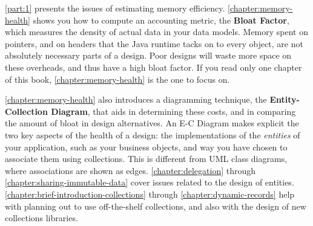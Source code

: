 

\autoref{part:1} presents the issues of estimating memory efficiency.
\autoref{chapter:memory-health} shows you how to compute an accounting metric,
the \textbf{Bloat Factor}, which measures the density of actual data in your
data models. Memory spent on pointers, and on headers that the Java runtime
tacks on to every object, are not absolutely necessary parts of a design. Poor
designs will waste more space on these overheads, and thus have a high bloat
factor. If you read only one chapter of this book,
\autoref{chapter:memory-health} is the one to focus on.

\autoref{chapter:memory-health} also introduces a diagramming technique, the
\textbf{Entity-Collection Diagram}, that aids in determining these costs, and in
comparing the amount of bloat in design alternatives.
An E-C Diagram makes explicit the two key aspects of the health of a design:
the implementations of the \emph{entities} of your application, such as your
business objects, and way you have chosen to associate them using collections.
This is different from UML class diagrams, where associations are shown as
edges.
\autoref{chapter:delegation} through
\autoref{chapter:sharing-immutable-data} cover issues related to the design of
entities.
\autoref{chapter:brief-introduction-collections} through
\autoref{chapter:dynamic-records} help with planning out to use off-the-shelf
collections, and also with the design of new collections libraries.

